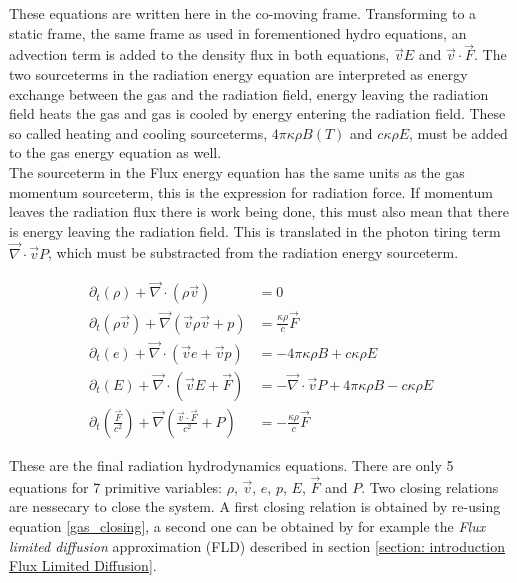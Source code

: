 These equations are written here in the co-moving frame. Transforming to a static frame, the same frame as used in forementioned hydro equations, an advection term is added to the density flux in  both equations, $\vec{v} E$ and $\vec{v} \cdot \vec{F}$. The two sourceterms in the radiation energy equation are interpreted as energy exchange between the gas and the radiation field, energy leaving the radiation field heats the gas and gas is cooled by energy entering the radiation field. These so called heating and cooling sourceterms, $4\pi \kappa\rho B(T)$ and $ c \kappa \rho E$, must be added to the gas energy equation as well. \\
The sourceterm in the Flux energy equation has the same units as the gas momentum sourceterm, this is the expression for radiation force. If momentum leaves the radiation flux there is work being done, this must also mean that there is energy leaving the radiation field. This is translated in the photon tiring term $\vec{\nabla} \cdot \vec{v} P$, which must be substracted from the radiation energy sourceterm.

\begin{align}
 \partial_t \left(\rho \right) + \vec{\nabla} \cdot \left( \rho \vec{v}  \right) &= 0 \label{eq: rhd_cont} \\
 \partial_t \left(\rho \vec{v} \right) + \vec{\nabla} \left( \vec{v} \rho \vec{v} + p \right) 
 &= \frac{\kappa \rho}{c} \vec{F} \label{eq: rhd_mom} \\
 \partial_t \left(e \right) + \vec{\nabla} \cdot \left( \vec{v} e + \vec{v} p \right) &= -4\pi \kappa\rho B + c \kappa \rho E \label{eq: rhd_e}\\
 \partial_t \left(E \right) +  \vec{\nabla} \cdot \left( \vec{v} E + \vec{F} \right) &=  -\vec{\nabla} \cdot \vec{v} P + 4\pi \kappa\rho B - c \kappa \rho E \label{eq: rhd_e_r} \\
 \partial_t \left(\frac{\vec{F}}{c^2} \right) +  \vec{\nabla} \left( \frac{\vec{v} \cdot \vec{F}}{c^2} + P \right) &= - \frac{\kappa \rho}{c} \vec{F} \label{eq: rhd_flux}
\end{align}



These are the final radiation hydrodynamics equations. There are only 5 equations for 7 primitive variables: $\rho$, $\vec{v}$, $e$, $p$, $E$, $\vec{F}$ and $P$. Two closing relations are nessecary to close the system. A first closing relation is obtained by re-using equation \eqref{gas_closing}, a second one can be obtained by for example the \emph{Flux limited diffusion} approximation (FLD) described in section \ref{section: introduction Flux Limited Diffusion}.

